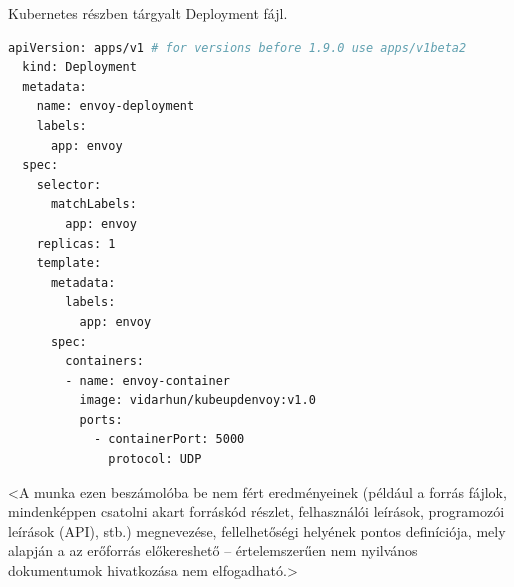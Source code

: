 \documentclass[a4paper,oneside]{article}
\begin{document}
Kubernetes részben tárgyalt Deployment fájl.
\begin{lstlisting}[language=bash]
  apiVersion: apps/v1 # for versions before 1.9.0 use apps/v1beta2
  kind: Deployment
  metadata:
    name: envoy-deployment
    labels:
      app: envoy
  spec:
    selector:
      matchLabels:
        app: envoy
    replicas: 1
    template:
      metadata:
        labels:
          app: envoy
      spec:
        containers:
        - name: envoy-container
          image: vidarhun/kubeupdenvoy:v1.0
          ports:
            - containerPort: 5000
              protocol: UDP
\end{lstlisting}
<A munka ezen beszámolóba be nem fért eredményeinek (például a forrás
fájlok, mindenképpen csatolni akart forráskód részlet, felhasználói
leírások, programozói leírások (API), stb.) megnevezése,
fellelhetőségi helyének pontos definíciója, mely alapján a az
erőforrás előkereshető -- értelemszerűen nem nyilvános dokumentumok
hivatkozása nem elfogadható.>
\end{document}
